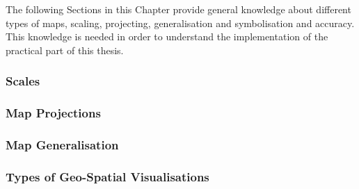 The following Sections in this Chapter provide general knowledge about different types of maps, scaling, projecting, generalisation and symbolisation and accuracy. This knowledge is needed in order to understand the implementation of the practical part of this thesis.

\subsubsection{Scales}
\label{s:map-scale}


\subsubsection{Map Projections}

\label{s:map-projections}

\subsubsection{Map Generalisation}


\subsubsection{Types of Geo-Spatial Visualisations}
\label{s:univariate-maps}
